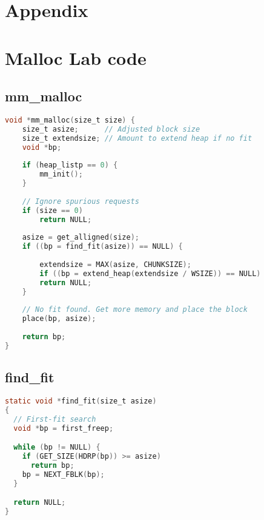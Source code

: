 \documentclass[11pt]{report}
\begin{document}
\printbibliography

\chapter{Appendix}
\appendix
{}

\chapter{Malloc Lab code}
\section{mm\_malloc}\label{appendix:malloc_lab_code_mm_malloc}
\begin{lstlisting}[language=C]
void *mm_malloc(size_t size) {
    size_t asize;      // Adjusted block size 
    size_t extendsize; // Amount to extend heap if no fit 
    void *bp;
    
    if (heap_listp == 0) {
        mm_init();
    }
    
    // Ignore spurious requests 
    if (size == 0)
        return NULL;
    
    asize = get_alligned(size);
    if ((bp = find_fit(asize)) == NULL) {
    
        extendsize = MAX(asize, CHUNKSIZE);
        if ((bp = extend_heap(extendsize / WSIZE)) == NULL)
        return NULL;
    }
    
    // No fit found. Get more memory and place the block 
    place(bp, asize);
    
    return bp;
}
\end{lstlisting}

\section{find\_fit}\label{appendix:malloc_lab_code_find_fit}
\begin{lstlisting}[language=C]
static void *find_fit(size_t asize)
{
  // First-fit search 
  void *bp = first_freep;

  while (bp != NULL) {
    if (GET_SIZE(HDRP(bp)) >= asize)
      return bp;
    bp = NEXT_FBLK(bp);
  }

  return NULL;
}
\end{lstlisting}
\end{document}
